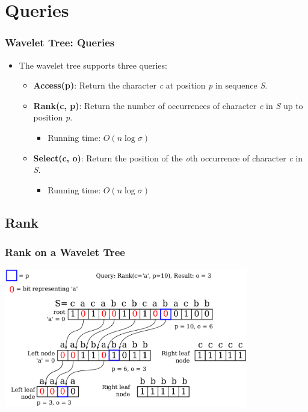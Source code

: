 \documentclass{beamer}
\begin{document}
\section{Queries}
\begin{frame}
\frametitle{Wavelet Tree: Queries}
\begin{itemize}
\item The wavelet tree supports three queries:
	\begin{itemize}
	\item \textbf{Access(p)}: Return the character \textit{c} at position \textit{p} in sequence \textit{S}.
	\item \textbf{Rank(c, p)}: Return the number of occurrences of character \textit{c} in \textit{S} up to position \textit{p}.
		\begin{itemize}
		\item Running time: $O(n \log \sigma)$
		\end{itemize}
	\item \textbf{Select(c, o)}: Return the position of the \textit{o}th occurrence of character \textit{c} in \textit{S}.
		\begin{itemize}
		\item Running time: $O(n \log \sigma)$
		\end{itemize}
		\end{itemize}
\end{itemize}

\end{frame}


\subsection{Rank}
\begin{frame}
\frametitle{Rank on a Wavelet Tree}
\begin{center}
	\center \includegraphics[width=0.8\textwidth]{RankDrawing}
\end{center}
\end{frame}
\end{document}

